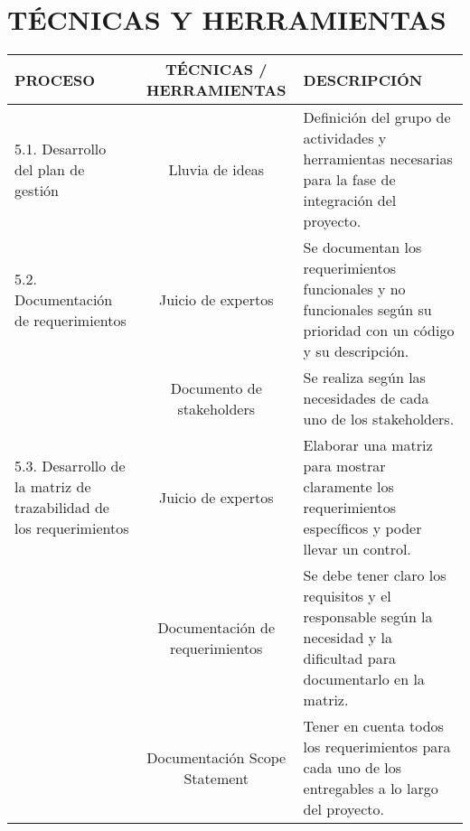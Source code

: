 \chapter{T\'ECNICAS Y HERRAMIENTAS}
%
\begin{table}[H]
	\centering
	\begin{tabular}{| m{5cm} | c | p{5cm} |}
	\hline
	\textbf{PROCESO} & \textbf{T\'ECNICAS / HERRAMIENTAS} & \textbf{DESCRIPCI\'ON} \\ \hline
	5.1. Desarrollo del plan de gesti\'on & Lluvia de ideas & Definici\'on del grupo de actividades y herramientas 
	necesarias para la fase de integraci\'on del proyecto.\\
	\hline
	5.2. Documentaci\'on de requerimientos & Juicio de expertos & Se documentan los requerimientos funcionales y no 
	funcionales seg\'un su prioridad con un c\'odigo y su descripci\'on. \\
	\cline{2-3}
	& Documento de stakeholders & Se realiza seg\'un las necesidades de cada uno de los stakeholders.\\
	\hline
	5.3. Desarrollo de la matriz de trazabilidad de los requerimientos & Juicio de expertos & Elaborar una matriz
	 para mostrar claramente los requerimientos espec\'ificos  y poder llevar un control.\\
	 \cline{2-3}
	& Documentaci\'on de requerimientos & Se debe tener claro los requisitos y el responsable seg\'un la necesidad y
	 la dificultad para documentarlo en la matriz.\\
	\cline{2-3}
	& Documentaci\'on Scope Statement & Tener en cuenta todos los requerimientos para cada uno de los entregables a 
	lo largo del proyecto.\\
	\hline
	\end{tabular}
\end{table}